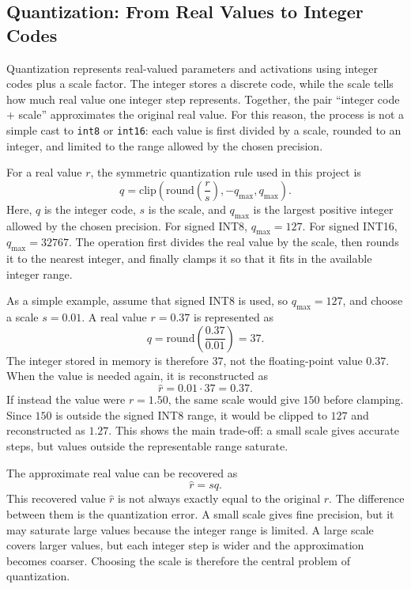 \documentclass[11pt,a4paper]{article}
\begin{document}
\subsection{Quantization: From Real Values to Integer Codes}

Quantization represents real-valued parameters and activations using integer codes plus a scale factor.
The integer stores a discrete code, while the scale tells how much real value one integer step represents.
Together, the pair ``integer code + scale'' approximates the original real value.
For this reason, the process is not a simple cast to \texttt{int8} or \texttt{int16}: each value is first divided by a scale, rounded to an integer, and limited to the range allowed by the chosen precision.

For a real value $r$, the symmetric quantization rule used in this project is
\begin{equation}
    q =
    \mathrm{clip}
    \left(
        \mathrm{round}
        \left(
            \frac{r}{s}
        \right),
        -q_{\max},
        q_{\max}
    \right).
    \label{eq:quantize}
\end{equation}
Here, $q$ is the integer code, $s$ is the scale, and $q_{\max}$ is the largest positive integer allowed by the chosen precision.
For signed INT8, $q_{\max}=127$.
For signed INT16, $q_{\max}=32767$.
The operation first divides the real value by the scale, then rounds it to the nearest integer, and finally clamps it so that it fits in the available integer range.

As a simple example, assume that signed INT8 is used, so $q_{\max}=127$, and choose a scale $s=0.01$.
A real value $r=0.37$ is represented as
\begin{equation}
    q = \mathrm{round}\left(\frac{0.37}{0.01}\right) = 37.
\end{equation}
The integer stored in memory is therefore $37$, not the floating-point value $0.37$.
When the value is needed again, it is reconstructed as
\begin{equation}
    \hat{r} = 0.01 \cdot 37 = 0.37.
\end{equation}
If instead the value were $r=1.50$, the same scale would give $150$ before clamping.
Since $150$ is outside the signed INT8 range, it would be clipped to $127$ and reconstructed as $1.27$.
This shows the main trade-off: a small scale gives accurate steps, but values outside the representable range saturate.

The approximate real value can be recovered as
\begin{equation}
    \hat{r} = s q.
    \label{eq:dequantize}
\end{equation}
This recovered value $\hat{r}$ is not always exactly equal to the original $r$.
The difference between them is the quantization error.
A small scale gives fine precision, but it may saturate large values because the integer range is limited.
A large scale covers larger values, but each integer step is wider and the approximation becomes coarser.
Choosing the scale is therefore the central problem of quantization.
\end{document}
